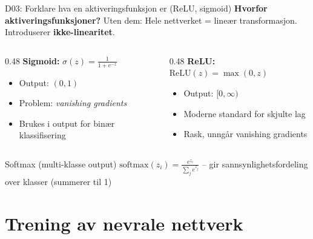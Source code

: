 \documentclass[aspectratio=169, 10pt]{beamer}
\begin{document}
\begin{frame}{D03: Forklare hva en aktiveringsfunksjon er (ReLU, sigmoid)}
    \textbf{Hvorfor aktiveringsfunksjoner?} Uten dem: Hele nettverket = lineær transformasjon. Introduserer \textbf{ikke-linearitet}.

    \vspace{0.2cm}
    \begin{columns}[T]
        \begin{column}{0.48\textwidth}
            \textbf{Sigmoid:} $\sigma(z) = \frac{1}{1 + e^{-z}}$
            \begin{itemize}
                \item Output: $(0, 1)$
                \item Problem: \textit{vanishing gradients}
                \item Brukes i output for binær klassifisering
            \end{itemize}
        \end{column}
        \begin{column}{0.48\textwidth}
            \textbf{ReLU:} $\text{ReLU}(z) = \max(0, z)$
            \begin{itemize}
                \item Output: $[0, \infty)$
                \item Moderne standard for skjulte lag
                \item Rask, unngår vanishing gradients
            \end{itemize}
        \end{column}
    \end{columns}

    \vspace{0.2cm}
    \begin{block}{\footnotesize Softmax (multi-klasse output)}
        \footnotesize $\text{softmax}(z_i) = \frac{e^{z_i}}{\sum_j e^{z_j}}$ -- gir sannsynlighetsfordeling over klasser (summerer til 1)
    \end{block}
\end{frame}

\section{Trening av nevrale nettverk}
\end{document}
